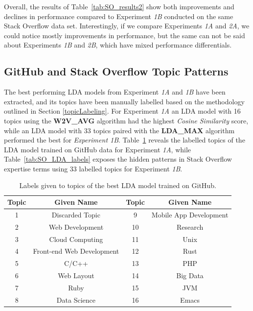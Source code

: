             Overall, the results of Table~\ref{tab:SO_results2} show both improvements and declines in performance compared to Experiment \emph{1B} conducted on the same Stack Overflow data set. Interestingly, if we compare Experiments \emph{1A} and \emph{2A}, we could notice mostly improvements in performance, but the same can not be said about Experiments \emph{1B} and \emph{2B}, which have mixed performance differentials. 
            
        \subsection{GitHub and Stack Overflow Topic Patterns\label{topic_patterns}}
        
            The best performing LDA models from Experiment \emph{1A} and \emph{1B} have been extracted, and its topics have been manually labelled based on the methodology outlined in Section \ref{topicLabeling}. For Experiment \emph{1A} an LDA model with 16 topics using the \textbf{W2V\_AVG} algorithm had the highest \emph{Cosine Similarity} score, while an LDA model with 33 topics paired with the \textbf{LDA\_MAX} algorithm performed the best for \emph{Experiment 1B}. Table~\ref{tab:GH_LDA_labels} reveals the labelled topics of the LDA model trained on GitHub data for Experiment \emph{1A}, while Table~\ref{tab:SO_LDA_labels} exposes the hidden patterns in Stack Overflow expertise terms using 33 labelled topics for Experiment \emph{1B}.
     
            \begin{table}
              \centering
              \caption{Labels given to topics of the best LDA model trained on GitHub.}\label{tab:GH_LDA_labels}
                \vspace{6pt} %
              \begin{tabular}{|c c|c c|}
                \hline
                Topic & Given Name & Topic & Given Name \\
                \hline
                1 & Discarded Topic & 9 & Mobile App Development \\
                2 & Web Development & 10 & Research \\
                3 & Cloud Computing & 11 & Unix \\
                4 & Front-end Web Development & 12 & Rust \\
                5 & C/C++ & 13 & PHP \\
                6 & Web Layout & 14 & Big Data \\
                7 & Ruby & 15 & JVM \\
                8 & Data Science & 16 & Emacs \\
                \hline
              \end{tabular}%
            \end{table}
            
